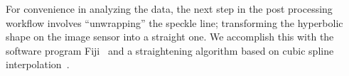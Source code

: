 For convenience in analyzing the data, the next step in the post processing
workflow involves ``unwrapping'' the speckle line; transforming the
hyperbolic shape on the image sensor into a straight one.  We accomplish
this with the software program Fiji~\cite{schindelin2012fiji} and a
straightening algorithm based on cubic spline
interpolation~\cite{kocsis1991image}.
